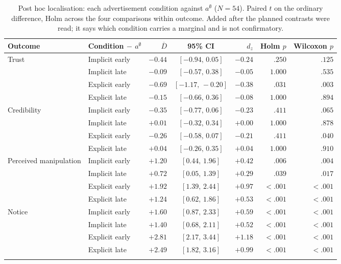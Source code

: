\begin{table}[!htb]
\centering
\small
\caption{Post hoc localisation: each advertisement condition against \(a^{\emptyset}\) (\(N=54\)). Paired \(t\) on the ordinary difference, Holm across the four comparisons within outcome. Added after the planned contrasts were read; it says which condition carries a marginal and is not confirmatory.}
\label{tab:beh-localisation}
\setlength{\tabcolsep}{4pt}
\begin{tabular}{@{}ll r c r r r@{}}
\toprule
Outcome & Condition \(-\) \(a^{\emptyset}\) & \(\overline{D}\) & 95\% CI & \(d_z\) & Holm \(p\) & Wilcoxon \(p\) \\
\midrule
Trust & Implicit early & $-0.44$ & $[-0.94,\,0.05]$ & $-0.24$ & $.250$ & $.125$ \\
 & Implicit late & $-0.09$ & $[-0.57,\,0.38]$ & $-0.05$ & $1.000$ & $.535$ \\
 & Explicit early & $-0.69$ & $[-1.17,\,-0.20]$ & $-0.38$ & $.031$ & $.003$ \\
 & Explicit late & $-0.15$ & $[-0.66,\,0.36]$ & $-0.08$ & $1.000$ & $.894$ \\
\addlinespace[2pt]
Credibility & Implicit early & $-0.35$ & $[-0.77,\,0.06]$ & $-0.23$ & $.411$ & $.065$ \\
 & Implicit late & $+0.01$ & $[-0.32,\,0.34]$ & $+0.00$ & $1.000$ & $.878$ \\
 & Explicit early & $-0.26$ & $[-0.58,\,0.07]$ & $-0.21$ & $.411$ & $.040$ \\
 & Explicit late & $+0.04$ & $[-0.26,\,0.35]$ & $+0.04$ & $1.000$ & $.910$ \\
\addlinespace[2pt]
Perceived manipulation & Implicit early & $+1.20$ & $[0.44,\,1.96]$ & $+0.42$ & $.006$ & $.004$ \\
 & Implicit late & $+0.72$ & $[0.05,\,1.39]$ & $+0.29$ & $.039$ & $.017$ \\
 & Explicit early & $+1.92$ & $[1.39,\,2.44]$ & $+0.97$ & $<.001$ & $<.001$ \\
 & Explicit late & $+1.24$ & $[0.62,\,1.86]$ & $+0.53$ & $<.001$ & $<.001$ \\
\addlinespace[2pt]
Notice & Implicit early & $+1.60$ & $[0.87,\,2.33]$ & $+0.59$ & $<.001$ & $<.001$ \\
 & Implicit late & $+1.40$ & $[0.68,\,2.11]$ & $+0.52$ & $<.001$ & $<.001$ \\
 & Explicit early & $+2.81$ & $[2.17,\,3.44]$ & $+1.18$ & $<.001$ & $<.001$ \\
 & Explicit late & $+2.49$ & $[1.82,\,3.16]$ & $+0.99$ & $<.001$ & $<.001$ \\
\addlinespace[2pt]
\bottomrule
\end{tabular}
\end{table}
